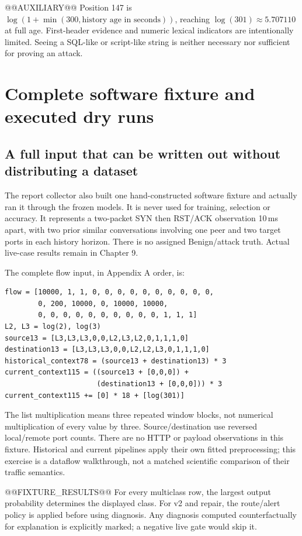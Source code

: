 \documentclass[11pt,a4paper,oneside]{report}
\begin{document}
@@AUXILIARY@@
Position 147 is $\log(1+\min(300,\text{history age in seconds}))$, reaching $\log(301)\approx5.707110$ at full age. First-header evidence and numeric lexical indicators are intentionally limited. Seeing a SQL-like or script-like string is neither necessary nor sufficient for proving an attack.

\chapter{Complete software fixture and executed dry runs}
\section{A full input that can be written out without distributing a dataset}
The report collector also built one hand-constructed software fixture and actually ran it through the frozen models. It is never used for training, selection or accuracy. It represents a two-packet SYN then RST/ACK observation 10\,ms apart, with two prior similar conversations involving one peer and two target ports in each history horizon. There is no assigned Benign/attack truth. Actual live-case results remain in Chapter 9.

The complete flow input, in Appendix A order, is:
\begin{lstlisting}
flow = [10000, 1, 1, 0, 0, 0, 0, 0, 0, 0, 0, 0, 0,
        0, 200, 10000, 0, 10000, 10000,
        0, 0, 0, 0, 0, 0, 0, 0, 0, 0, 1, 1, 1]
L2, L3 = log(2), log(3)
source13 = [L3,L3,L3,0,0,L2,L3,L2,0,1,1,1,0]
destination13 = [L3,L3,L3,0,0,L2,L2,L3,0,1,1,1,0]
historical_context78 = (source13 + destination13) * 3
current_context115 = ((source13 + [0,0,0]) +
                      (destination13 + [0,0,0])) * 3
current_context115 += [0] * 18 + [log(301)]
\end{lstlisting}
The list multiplication means three repeated window blocks, not numerical multiplication of every value by three. Source/destination use reversed local/remote port counts. There are no HTTP or payload observations in this fixture. Historical and current pipelines apply their own fitted preprocessing; this exercise is a dataflow walkthrough, not a matched scientific comparison of their traffic semantics.

@@FIXTURE_RESULTS@@
For every multiclass row, the largest output probability determines the displayed class. For v2 and repair, the route/alert policy is applied before using diagnosis. Any diagnosis computed counterfactually for explanation is explicitly marked; a negative live gate would skip it.
\end{document}
